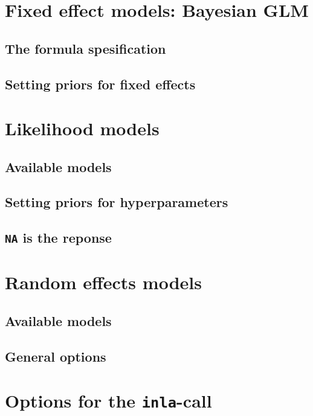 \documentclass[a4paper,11pt]{report}
\newcommand{\tv}{\texttt}
\begin{document}
\chapter{Fixed effect models: Bayesian GLM}

\section{The formula spesification}

\section{Setting priors for fixed effects}



\chapter{Likelihood models}

\section{Available models}

\section{Setting priors for hyperparameters}

\section{\tv{NA} is the reponse}



\chapter{Random effects models}

\section{Available models}

\section{General options}



\chapter{Options for the \tv{inla}-call}
\end{document}
